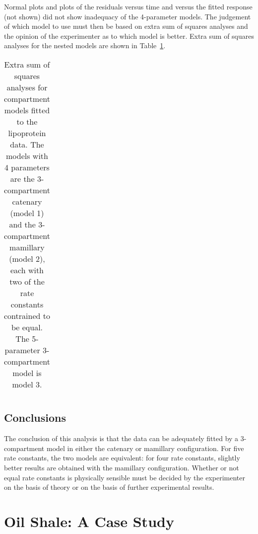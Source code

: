 Normal plots and plots of the residuals versus time and versus the
fitted response (not shown) did not show inadequacy of the 4-parameter
models.
The judgement of which model to use must then be based on extra sum of
squares analyses and the opinion of the experimenter as to which model
is better.
Extra sum of squares analyses for the nested models are shown
in Table~\ref{tbl:5.3}.
\begin{table}
  \begin{tabular}{l r r r r r}
  \end{tabular}
  \caption{\label{tbl:5.3}
  Extra sum of squares analyses for compartment models fitted to the
  lipoprotein data.
  The models with 4 parameters are the 3-compartment catenary (model 1)
  and the 3-compartment mamillary (model 2), each with two of the rate
  constants contrained to be equal.
  The 5-parameter 3-compartment model is model 3.
  }
\end{table}

\subsection{Conclusions}

The conclusion of this analysis is that the data can be
adequately fitted by a 3-compartment model in either the catenary
or mamillary configuration.
For five rate constants, the two models are equivalent:
for four rate constants, slightly better results are obtained
with the mamillary configuration.
Whether or not equal rate constants is physically sensible must
be decided by the experimenter on the basis of theory or on the
basis of further experimental results.

\section{Oil Shale: A Case Study}

